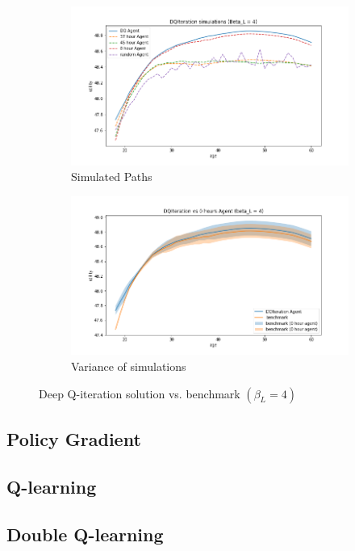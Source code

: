\begin{figure}[ht]
\begin{subfigure}{.5\textwidth}
  \centering
  \includegraphics[width=1\linewidth]{figures/dqi_model1_beta_4_solution_benchmark_paths.png}
  \caption{Simulated Paths}
  \label{fig:dqi_solution_beta4_path}
\end{subfigure}%
\begin{subfigure}{.5\textwidth}
  \centering
  \includegraphics[width=1\linewidth]{figures/dqi_model1_beta_4_solution_benchmark_variance.png}
  \caption{Variance of simulations}
  \label{fig:dqi_solution_beta4_var}
\end{subfigure}
    \caption{Deep Q-iteration solution vs. benchmark $(\beta_L = 4)$}
    \label{fig:dqi_solution_beta4}
\end{figure}

\subsection{Policy Gradient}

\subsection{Q-learning}

\subsection{Double Q-learning}


